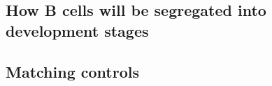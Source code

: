 \documentclass[12pt]{article}
\begin{document}
		\subsection{How B cells will be segregated into development stages}
		
		\subsection{Matching controls}
		
	
	
	
	
	
	
	
	
\end{document}
